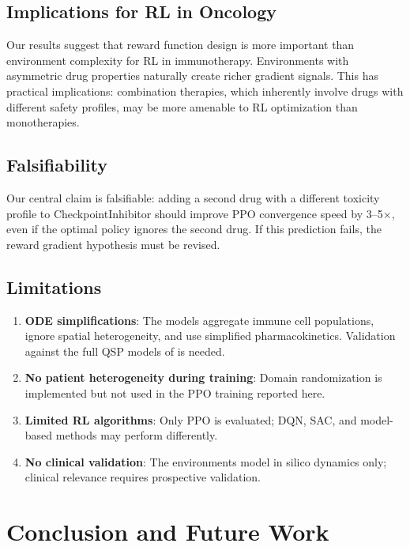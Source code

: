 \documentclass[11pt,a4paper]{article}
\begin{document}
\subsection{Implications for RL in Oncology}

Our results suggest that reward function design is more important than environment complexity for RL in immunotherapy. Environments with asymmetric drug properties naturally create richer gradient signals. This has practical implications: combination therapies, which inherently involve drugs with different safety profiles, may be more amenable to RL optimization than monotherapies.

\subsection{Falsifiability}

Our central claim is falsifiable: adding a second drug with a different toxicity profile to CheckpointInhibitor should improve PPO convergence speed by 3--5$\times$, even if the optimal policy ignores the second drug. If this prediction fails, the reward gradient hypothesis must be revised.

\subsection{Limitations}

\begin{enumerate}
    \item \textbf{ODE simplifications}: The models aggregate immune cell populations, ignore spatial heterogeneity, and use simplified pharmacokinetics. Validation against the full QSP models of \citet{Milberg2019} is needed.
    \item \textbf{No patient heterogeneity during training}: Domain randomization is implemented but not used in the PPO training reported here.
    \item \textbf{Limited RL algorithms}: Only PPO is evaluated; DQN, SAC, and model-based methods may perform differently.
    \item \textbf{No clinical validation}: The environments model in silico dynamics only; clinical relevance requires prospective validation.
\end{enumerate}

\section{Conclusion and Future Work}
\end{document}
